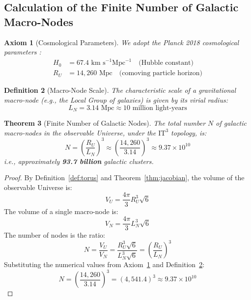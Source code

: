 \documentclass[12pt,a4paper,oneside]{article}
\newtheorem{theorem}{Theorem}[section]
\newtheorem{definition}[theorem]{Definition}
\newtheorem{axiom}[theorem]{Axiom}
\newcommand{\ITthree}{\text{IT}^3}
\begin{document}
\subsection{Calculation of the Finite Number of Galactic Macro-Nodes}

\begin{axiom}[Cosmological Parameters]
\label{ax:cosmo}
We adopt the Planck 2018 cosmological parameters \cite{Planck2018}:
\begin{align}
    H_0 &= 67.4 \text{ km s}^{-1} \text{Mpc}^{-1} \quad \text{(Hubble constant)} \\
    R_U &= 14,260 \text{ Mpc} \quad \text{(comoving particle horizon)}
\end{align}
\end{axiom}

\begin{definition}[Macro-Node Scale]
\label{def:macronode}
The characteristic scale of a gravitational macro-node (e.g., the Local Group of galaxies) is given by its virial radius:
\begin{equation}
    L_N = 3.14 \text{ Mpc} \approx 10 \text{ million light-years}
\end{equation}
\end{definition}

\begin{theorem}[Finite Number of Galactic Nodes]
\label{thm:finite}
The total number $N$ of galactic macro-nodes in the observable Universe, under the $\ITthree$ topology, is:
\begin{equation}
    \boxed{N = \left( \frac{R_U}{L_N} \right)^3 \approx \left( \frac{14,260}{3.14} \right)^3 \approx 9.37 \times 10^{10}}
\end{equation}
i.e., approximately \textbf{93.7 billion} galactic clusters.
\end{theorem}

\begin{proof}
By Definition~\ref{def:torus} and Theorem~\ref{thm:jacobian}, the volume of the observable Universe is:
\begin{equation}
    V_U = \frac{4\pi}{3} R_U^3 \sqrt{6}
\end{equation}
The volume of a single macro-node is:
\begin{equation}
    V_N = \frac{4\pi}{3} L_N^3 \sqrt{6}
\end{equation}
The number of nodes is the ratio:
\begin{equation}
    N = \frac{V_U}{V_N} = \frac{R_U^3 \sqrt{6}}{L_N^3 \sqrt{6}} = \left( \frac{R_U}{L_N} \right)^3
\end{equation}
Substituting the numerical values from Axiom~\ref{ax:cosmo} and Definition~\ref{def:macronode}:
\begin{equation}
    N = \left( \frac{14,260}{3.14} \right)^3 = (4,541.4)^3 \approx 9.37 \times 10^{10}
\end{equation}
\end{proof}
\end{document}
